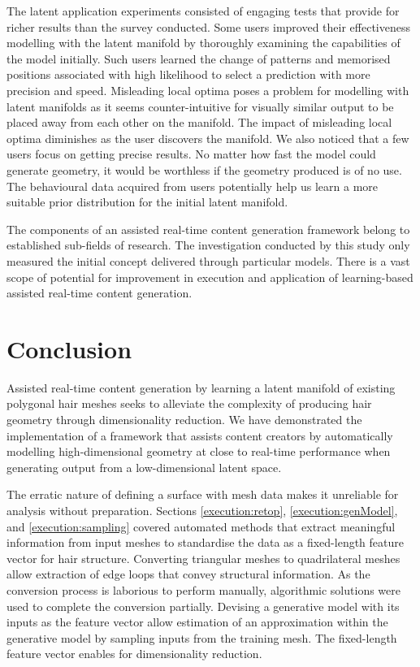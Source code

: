 \documentclass[ %
author={Dillon Keith Diep},
supervisor={Dr. Carl Henrik Ek},
degree={MEng},
title={ART-CG Hair:},
subtitle={Assisted Real-time Content Generation of Stylised Virtual Hair},
type={Research},
year={2017} ]{dissertation}
\begin{document}
	The latent application experiments consisted of engaging tests that provide for richer results than the survey conducted. Some users improved their effectiveness modelling with the latent manifold by thoroughly examining the capabilities of the model initially. Such users learned the change of patterns and memorised positions associated with high likelihood to select a prediction with more precision and speed. Misleading local optima poses a problem for modelling with latent manifolds as it seems counter-intuitive for visually similar output to be placed away from each other on the manifold. The impact of misleading local optima diminishes as the user discovers the manifold. We also noticed that a few users focus on getting precise results. No matter how fast the model could generate geometry, it would be worthless if the geometry produced is of no use. The behavioural data acquired from users potentially help us learn a more suitable prior distribution for the initial latent manifold.
	
	The components of an assisted real-time content generation framework belong to established sub-fields of research. The investigation conducted by this study only measured the initial concept delivered through particular models. There is a vast scope of potential for improvement in execution and application of learning-based assisted real-time content generation.
	
	
	\chapter{Conclusion}
	\label{chap:conclusion}
	Assisted real-time content generation by learning a latent manifold of existing polygonal hair meshes seeks to alleviate the complexity of producing hair geometry through dimensionality reduction.
	We have demonstrated the implementation of a framework that assists content creators by automatically modelling high-dimensional geometry at close to real-time performance when generating output from a low-dimensional latent space.
	
	The erratic nature of defining a surface with mesh data makes it unreliable for analysis without preparation.
	Sections \ref{execution:retop}, \ref{execution:genModel}, and \ref{execution:sampling} covered automated methods that extract meaningful information from input meshes to standardise the data as a fixed-length feature vector for hair structure.
	Converting triangular meshes to quadrilateral meshes allow extraction of edge loops that convey structural information. As the conversion process is laborious to perform manually, algorithmic solutions were used to complete the conversion partially.
	Devising a generative model with its inputs as the feature vector allow estimation of an approximation within the generative model by sampling inputs from the training mesh.
	The fixed-length feature vector enables for dimensionality reduction.
	
\end{document}
